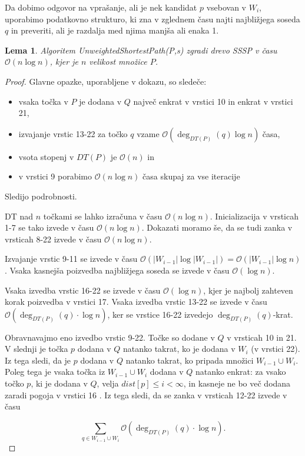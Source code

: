 \documentclass[a4paper, 12pt]{book}
\newcommand{\OO}{\ensuremath{\mathcal{O}}} %
\newtheorem{lema}[izrek]{Lema}
\begin{document}
Da dobimo odgovor na vprašanje, ali je nek kandidat $p$ vsebovan v $W_i$, uporabimo podatkovno strukturo, ki zna v zglednem času najti najbližjega soseda $q$ in preveriti, ali je razdalja med njima manjša ali enaka 1.

\begin{lema}
\label{lema3}
Algoritem \textit{Unweigh\-ted\-Shor\-test\-Path(P,s)} zgradi drevo SSSP v času $\OO(n\log n)$, kjer je $n$ velikost množice $P$.
\end{lema}

\begin{proof}
Glavne opazke, uporabljene v dokazu, so sledeče:
\begin{itemize}
\item vsaka točka v $P$ je dodana v $Q$ največ enkrat v vrstici 10 in enkrat v vrstici 21,
\item izvajanje vrstic 13-22 za točko $q$ vzame $\OO(\deg_{DT(P)}(q)\log n)$ časa,
\item vsota stopenj v $DT(P)$ je $\OO(n)$ in
\item v vrstici 9 porabimo $\OO(n\log n)$ časa skupaj za vse iteracije
\end{itemize}
Sledijo podrobnosti.

DT nad $n$ točkami se lahko izračuna v času $\OO(n\log n)$. Inicializacija v vrsticah 1-7 se tako izvede v času $\OO(n\log n)$. Dokazati moramo še, da se tudi zanka v vrsticah 8-22 izvede v času $\OO(n\log n)$.

Izvajanje vrstic 9-11 se izvede v času $\OO(|W_{i-1}|\log |W_{i-1}|) = \OO(|W_{i-1}|\log n)$. Vsaka kasnejša poizvedba najbližjega soseda se izvede v času $\OO(\log n)$.

Vsaka izvedba vrstic 16-22 se izvede v času $\OO(\log n)$, kjer je najbolj zahteven korak poizvedba v vrstici 17. Vsaka izvedba vrstic 13-22 se izvede v času $\OO(\deg_{DT(P)}(q)\cdot\log n)$, ker se vrstice 16-22 izvedejo $\deg_{DT(P)}(q)$-krat.

Obravnavajmo eno izvedbo vrstic 9-22. Točke so dodane v $Q$ v vrsticah 10 in 21. V slednji je točka $p$ dodana v $Q$ natanko takrat, ko je dodana v $W_i$ (v vrstici 22). Iz tega sledi, da je $p$ dodana v $Q$ natanko takrat, ko pripada množici $W_{i-1}\cup W_i$. Poleg tega je vsaka točka iz $W_{i-1}\cup W_i$ dodana v $Q$ natanko enkrat: za vsako točko $p$, ki je dodana v $Q$, velja $dist[p]\leq i < \infty$, in kasneje ne bo več dodana zaradi pogoja v vrstici 16
. Iz tega sledi, da se zanka v vrsticah 12-22 izvede v času

\begin{equation*}
\sum_{q\in W_{i-1}\cup W_i} \OO(\deg_{DT(P)}(q) \cdot \log n).
\end{equation*}


\end{proof}
\end{document}
